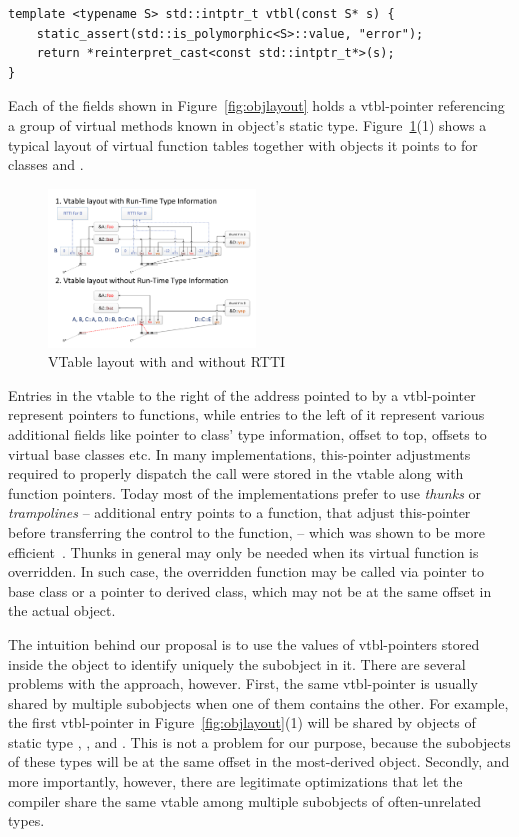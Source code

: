 \begin{lstlisting}
template <typename S> std::intptr_t vtbl(const S* s) {
    static_assert(std::is_polymorphic<S>::value, "error");
    return *reinterpret_cast<const std::intptr_t*>(s);
}
\end{lstlisting}

\noindent
Each of the  fields shown in Figure~\ref{fig:objlayout} holds a 
vtbl-pointer referencing a group of virtual methods known in object's static 
type. Figure~\ref{fig:vtbl}(1) shows a typical layout of virtual function tables 
together with objects it points to for classes  and .

\noindent
\begin{figure}[htbp]
  \centering
    \includegraphics[width=0.49\textwidth]{v-table.pdf}
  \caption{VTable layout with and without RTTI}
  \label{fig:vtbl}
\end{figure}

Entries in the vtable to the right of the address pointed to by a vtbl-pointer 
represent pointers to functions, while entries to the left of it represent 
various additional fields like pointer to class' type information, offset to 
top, offsets to virtual base classes etc. In many implementations, this-pointer 
adjustments required to properly dispatch the call were stored in the vtable 
along with function pointers. Today most of the implementations prefer to use 
\emph{thunks} or \emph{trampolines} -- additional entry points to a function, 
that adjust this-pointer before transferring the control to the function, -- 
which was shown to be more efficient~\cite{Driesen96}. Thunks in general may 
only be needed when its virtual function is overridden. In such case, the 
overridden function may be called via pointer to base class or a pointer to 
derived class, which may not be at the same offset in the actual object.

The intuition behind our proposal is to use the values of vtbl-pointers stored 
inside the object to identify uniquely the subobject in it. There are several 
problems with the approach, however. First, the same vtbl-pointer is 
usually shared by multiple subobjects when one of them contains the other. For 
example, the first vtbl-pointer in Figure~\ref{fig:objlayout}(1) will be shared 
by objects of static type , ,  and . This is 
not a problem for our purpose, because the subobjects of these types will be at 
the same offset in the most-derived object. Secondly, and more importantly, 
however, there are legitimate optimizations that let the compiler share the same 
vtable among multiple subobjects of often-unrelated types.

